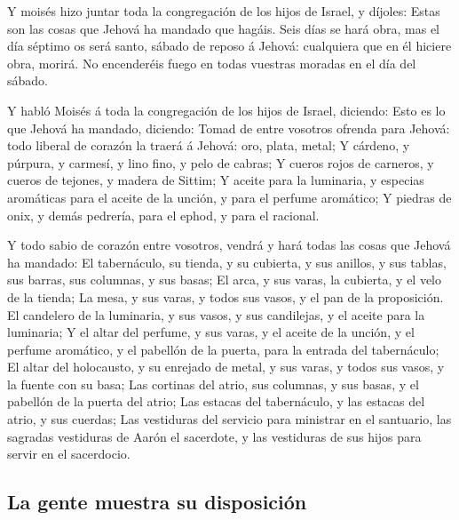  Y moisés hizo juntar toda la congregación de los hijos de
Israel, y díjoles: Estas son las cosas que Jehová ha mandado que hagáis.
 Seis días se hará obra, mas el día séptimo os será santo,
sábado de reposo á Jehová: cualquiera que en él hiciere obra, morirá.
 No encenderéis fuego en todas vuestras moradas en el día
del sábado.

 Y habló Moisés á toda la congregación de los hijos de
Israel, diciendo: Esto es lo que Jehová ha mandado, diciendo:
 Tomad de entre vosotros ofrenda para Jehová: todo liberal
de corazón la traerá á Jehová: oro, plata, metal;  Y
cárdeno, y púrpura, y carmesí, y lino fino, y pelo de cabras;
 Y cueros rojos de carneros, y cueros de tejones, y madera
de Sittim;  Y aceite para la luminaria, y especias
aromáticas para el aceite de la unción, y para el perfume aromático;
 Y piedras de onix, y demás pedrería, para el ephod, y para
el racional.

 Y todo sabio de corazón entre vosotros, vendrá y hará
todas las cosas que Jehová ha mandado:  El tabernáculo, su
tienda, y su cubierta, y sus anillos, y sus tablas, sus barras, sus
columnas, y sus basas;  El arca, y sus varas, la cubierta,
y el velo de la tienda;  La mesa, y sus varas, y todos sus
vasos, y el pan de la proposición.  El candelero de la
luminaria, y sus vasos, y sus candilejas, y el aceite para la luminaria;
 Y el altar del perfume, y sus varas, y el aceite de la
unción, y el perfume aromático, y el pabellón de la puerta, para la
entrada del tabernáculo;  El altar del holocausto, y su
enrejado de metal, y sus varas, y todos sus vasos, y la fuente con su
basa;  Las cortinas del atrio, sus columnas, y sus basas, y
el pabellón de la puerta del atrio;  Las estacas del
tabernáculo, y las estacas del atrio, y sus cuerdas;  Las
vestiduras del servicio para ministrar en el santuario, las sagradas
vestiduras de Aarón el sacerdote, y las vestiduras de sus hijos para
servir en el sacerdocio.

\hypertarget{la-gente-muestra-su-disposiciuxf3n}{%
\subsection{La gente muestra su
disposición}\label{la-gente-muestra-su-disposiciuxf3n}}

